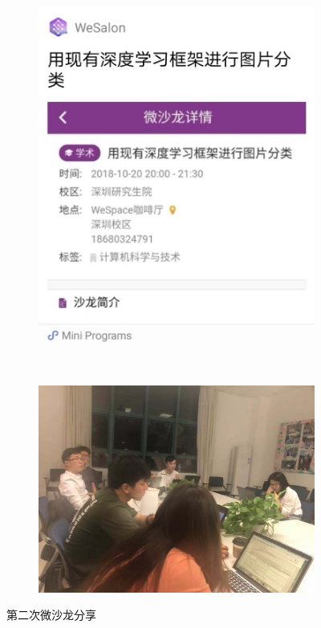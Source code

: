\documentclass[12pt]{ctexart}
\begin{document}
\begin{figure}[!ht]
\centering
  \begin{subfigure}[b]{0.4\textwidth}
  \includegraphics[width=\textwidth]{2/2.jpeg}  
    \end{subfigure}~
      \begin{subfigure}[b]{0.5\textwidth}
  \includegraphics[width=\textwidth]{2/wesalon.jpeg}  
    \end{subfigure}
    \caption{第二次微沙龙分享}    
\end{figure}
\end{document}
